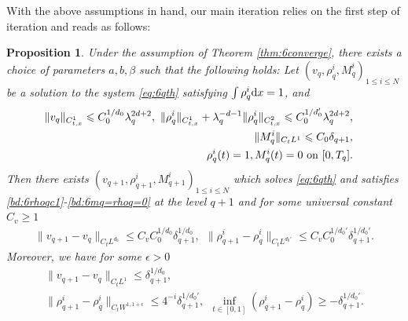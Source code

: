 \documentclass[UTF-8,reqno]{amsart}
\numberwithin{equation}{section}
\newtheorem{proposition}[theorem]{Proposition}
\theoremstyle{definition}
\def\dif{{\mathord{{\rm d}}}}
\def\geq{\geqslant}
\def\leq{\leqslant}
\def\dif{{\mathord{{\rm d}}}}
\def\bp{\begin{proposition}}
\def\ep{\end{proposition}}
\def\geq{\geqslant}
\def\leq{\leqslant}
\begin{document}
With the above assumptions in hand, our main iteration relies on the first step of iteration and reads as follows:


\bp\label{prop:case6} 
Under the assumption of Theorem \ref{thm:6converge}, there exists   a choice of parameters $a,b,\beta$  such
that the following holds: Let $(v_q,\rho^{i}_q,  M^{i}_q)_{1\leq i\leq N}$ be a solution to the system \eqref{eq:6qth} satisfying  $\int\rho^{i}_q\dif x=1$,
and
\begin{align}
\|v_q\|_{C_{t,x}^1}\leq C_0^{1/d_0}\lambda_q^{2d+2},\
\|\rho^{i}_{q}\|_{C_{t,x}^1}+\lambda_q^{-d-1}\|\rho^{i}_{q}\|_{C_{t,x}^2}\leq C_0^{1/d_0'}\lambda_q^{2d+2},
\label{bd:6rhoqc1}\\
 \|M^{i}_q\|_{C_tL^1}\leq C_0 \delta_{q+1},&\label{bd:6rql1} \\
  \rho^{i}_q(t)=1, M^{i}_q(t)=0\ {\rm on}\ [0,T_q].&\label{bd:6mq=rhoq=0}
\end{align}
Then there exists 
$(v_{q+1},\rho^{i}_{q+1},  M^{i}_{q+1})_{1\leq i\leq N}$ which solves \eqref{eq:6qth} and satisfies \eqref{bd:6rhoqc1}-\eqref{bd:6mq=rhoq=0} at the level $q+1$ and for some universal constant $C_v\geq1$
\begin{align}
\|v_{q+1}-v_{q}\|_{C_tL^{d_0}}\leq
C_vC_0^{1/d_0}\delta_{q+1}^{1/d_0},\label{bd:6vq+1-vqldd}\ \
\|\rho^{i}_{q+1}-\rho^{i}_{q}\|_{C_tL^{d_0'}}\leq
C_v C_0^{1/{d_0'}} \delta_{q+1}^{1/{d_0'}}.%
\end{align}
Moreover, we have for some $\epsilon>0$
\begin{align}
   \|v_{q+1}-v_q\|_{C_tL^1}\leq
\delta_{q+1}^{1/d_0},\label{bd:6vq+1-vqlpr}\\
\|\rho^{i}_{q+1}-\rho^{i}_{q}\|_{C_tW^{1,1+\epsilon}}%
\leq
 4^{-i}\delta_{q+1}^{1/d_0'},\ \  \inf_{t\in [0,1]}(\rho^{i}_{q+1} - \rho^{i}_q)\geq - \delta_{q+1}^{1/d_0'} .\label{bd:6rhoq+1-rhoql1}
\end{align}
\ep
  
\end{document}
